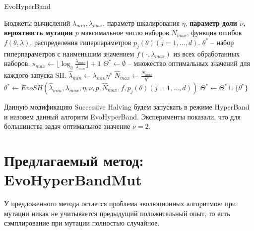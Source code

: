 \documentclass[a4paper,12pt]{article}
\begin{document}
\begin{algorithm}[H]
    \caption{EvoHyperBand}\label{alg:ehb}
  \begin{algorithmic}[1]
    \INPUT Бюджеты вычислений $\lambda_{min}, \lambda_{max}$, параметр шкалирования $\eta$, \textbf{параметр доли $\nu$, вероятность мутации $p$} максимальное число наборов $N_{max}$, функция ошибок $f(\theta, \lambda)$, распределения гиперпараметров $p_{j}(\theta) (j = 1,\dots,d)$.
    \OUTPUT $\theta^*$ -- набор гиперпараметров с наименьшим значением $f(\cdot, \lambda_{max})$ из всех обработанных наборов.
    \STATE $s_{max} \gets \lfloor \log_{\eta} \frac{\lambda_{max}}{\lambda_{min}} \rfloor + 1$
    \STATE $\Theta^* \gets \emptyset$ -- множество оптимальных значений для каждого запуска SH.
        \STATE $\hat{\lambda}_{min} \gets \lambda_{min}\eta^{s}$
        \STATE $\hat{N}_{max} \gets \frac{N_{max}}{\eta^{s}}$
        \STATE $\theta^* \gets EvoSH(\hat{\lambda}_{min}, \lambda_{max}, \eta, \nu, p, \hat{N}_{max}, f, p_{j}(\theta) (j = 1,\dots,d))$
        \STATE $\Theta^* \gets \Theta^* \cup \{\theta^*\}$
    \ENDFOR
  \end{algorithmic}

\end{algorithm}

Данную модификацию Successive Halving будем запускать в режиме HyperBand и назовем данный алгоритм EvoHyperBand. Эксперименты показали, что для большинства задач оптимальное значение $\nu=2$. 

\section{Предлагаемый метод: EvoHyperBandMut}
У предложенного метода остается проблема эволюционных алгоритмов: при мутации никак не учитывается предыдущий положительный опыт, то есть сэмплирование при мутации полностью случайное.
\end{document}
